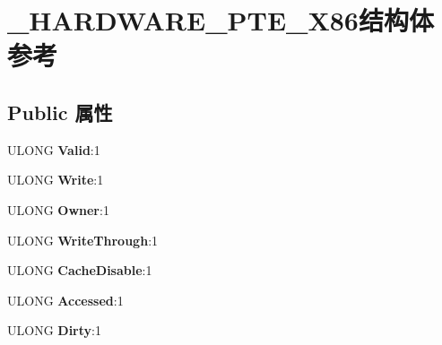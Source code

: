 \hypertarget{struct___h_a_r_d_w_a_r_e___p_t_e___x86}{}\section{\+\_\+\+H\+A\+R\+D\+W\+A\+R\+E\+\_\+\+P\+T\+E\+\_\+\+X86结构体 参考}
\label{struct___h_a_r_d_w_a_r_e___p_t_e___x86}
\subsection*{Public 属性}
\begin{DoxyCompactItemize}
\item 
\mbox{\label{struct___h_a_r_d_w_a_r_e___p_t_e___x86_aa48a9abcd61e2f2e6704ecdbf0cf0c72}} 
U\+L\+O\+NG {\bfseries Valid}\+:1
\item 
\mbox{\label{struct___h_a_r_d_w_a_r_e___p_t_e___x86_a24fe8cd28956c3f6eccdc9c76e64bd62}} 
U\+L\+O\+NG {\bfseries Write}\+:1
\item 
\mbox{\label{struct___h_a_r_d_w_a_r_e___p_t_e___x86_a05e134d8d69c0c6d31b6dc4eeb72896c}} 
U\+L\+O\+NG {\bfseries Owner}\+:1
\item 
\mbox{\label{struct___h_a_r_d_w_a_r_e___p_t_e___x86_ae1d8e0d16c0ccc7e5e531643d0765e26}} 
U\+L\+O\+NG {\bfseries Write\+Through}\+:1
\item 
\mbox{\label{struct___h_a_r_d_w_a_r_e___p_t_e___x86_a98c282af119c490ca378fa9ce9629401}} 
U\+L\+O\+NG {\bfseries Cache\+Disable}\+:1
\item 
\mbox{\label{struct___h_a_r_d_w_a_r_e___p_t_e___x86_a1d12ed9b9be96223b966517d4699cb80}} 
U\+L\+O\+NG {\bfseries Accessed}\+:1
\item 
\mbox{\label{struct___h_a_r_d_w_a_r_e___p_t_e___x86_a2864fb8f34966e957e7fb4f21360d4a0}} 
U\+L\+O\+NG {\bfseries Dirty}\+:1
\item 
\mbox{\label{struct___h_a_r_d_w_a_r_e___p_t_e___x86_a67e697ff40254298a6b239d140ec6cb7}} 

\end{DoxyCompactItemize}

